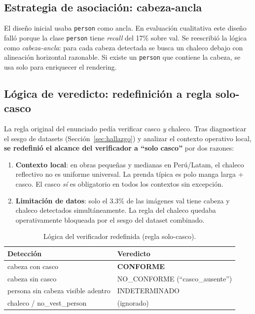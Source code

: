 \documentclass[conference]{IEEEtran}
\begin{document}
\subsection{Estrategia de asociación: cabeza-ancla}

El diseño inicial usaba \texttt{person} como ancla. En evaluación
cualitativa este diseño falló porque la clase \texttt{person} tiene
\emph{recall} del 17\% sobre val. Se reescribió la lógica como
\emph{cabeza-ancla}: para cada cabeza detectada se busca un chaleco
debajo con alineación horizontal razonable. Si existe un
\texttt{person} que contiene la cabeza, se usa solo para enriquecer
el rendering.

\subsection{Lógica de veredicto: redefinición a regla solo-casco}

La regla original del enunciado pedía verificar casco \emph{y} chaleco.
Tras diagnosticar el sesgo de datasets (Sección~\ref{sec:hallazgo}) y
analizar el contexto operativo local, \textbf{se redefinió el alcance
del verificador a ``solo casco''} por dos razones:
\begin{enumerate}
    \item \textbf{Contexto local}: en obras pequeñas y medianas en
    Perú/Latam, el chaleco reflectivo no es uniforme universal. La
    prenda típica es polo manga larga + casco. El casco \emph{sí} es
    obligatorio en todos los contextos sin excepción.
    \item \textbf{Limitación de datos}: solo el 3.3\% de las imágenes
    val tiene cabeza y chaleco detectados simultáneamente. La regla
    del chaleco quedaba operativamente bloqueada por el sesgo del
    dataset combinado.
\end{enumerate}

\begin{table}[h]
\centering
\caption{Lógica del verificador redefinida (regla solo-casco).}
\label{tab:logic}
\renewcommand{\arraystretch}{1.15}
\begin{tabular}{p{4cm} l}
\toprule
\textbf{Detección} & \textbf{Veredicto} \\
\midrule
cabeza con casco & \textbf{CONFORME} \\
cabeza sin casco & NO\_CONFORME (``casco\_ausente'') \\
persona sin cabeza visible adentro & INDETERMINADO \\
chaleco / no\_vest\_person & (ignorado) \\
\bottomrule
\end{tabular}
\end{table}
\end{document}
